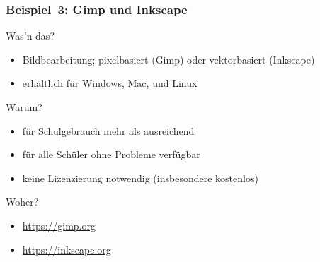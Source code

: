 \documentclass{beamer}
\begin{document}
\begin{frame}
  \frametitle{Beispiel~3: Gimp und Inkscape}

  \onslide<+->

  \begin{block}{Was'n das?}
    \begin{itemize}
    \item Bildbearbeitung; pixelbasiert (Gimp) oder vektorbasiert (Inkscape)
    \item erhältlich für Windows, Mac, und Linux
    \end{itemize}
  \end{block}

  \onslide<+->

  \begin{block}{Warum?}
    \begin{itemize}
    \item für Schulgebrauch mehr als ausreichend
    \item für alle Schüler ohne Probleme verfügbar
    \item keine Lizenzierung notwendig (insbesondere kostenlos)
    \end{itemize}
  \end{block}

  \onslide<+->

  \begin{block}{Woher?}
    \begin{itemize}
    \item \url{https://gimp.org}
    \item \url{https://inkscape.org}
    \end{itemize}
  \end{block}


\end{frame}
\end{document}

